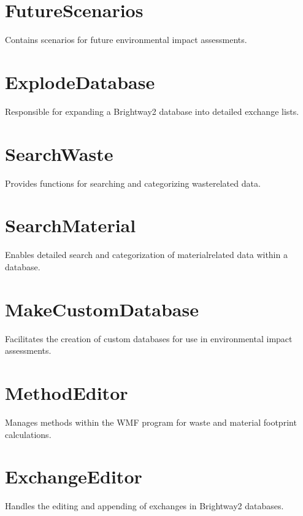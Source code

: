 \documentclass[letterpaper,10pt,english]{sphinxmanual}
\begin{document}
\section{FutureScenarios}
\label{\detokenize{modules:futurescenarios}}
\sphinxAtStartPar
Contains scenarios for future environmental impact assessments.


\section{ExplodeDatabase}
\label{\detokenize{modules:explodedatabase}}
\sphinxAtStartPar
Responsible for expanding a Brightway2 database into detailed exchange lists.


\section{SearchWaste}
\label{\detokenize{modules:searchwaste}}
\sphinxAtStartPar
Provides functions for searching and categorizing waste\sphinxhyphen{}related data.


\section{SearchMaterial}
\label{\detokenize{modules:searchmaterial}}
\sphinxAtStartPar
Enables detailed search and categorization of material\sphinxhyphen{}related data within a database.


\section{MakeCustomDatabase}
\label{\detokenize{modules:makecustomdatabase}}
\sphinxAtStartPar
Facilitates the creation of custom databases for use in environmental impact assessments.


\section{MethodEditor}
\label{\detokenize{modules:methodeditor}}
\sphinxAtStartPar
Manages methods within the WMF program for waste and material footprint calculations.


\section{ExchangeEditor}
\label{\detokenize{modules:exchangeeditor}}
\sphinxAtStartPar
Handles the editing and appending of exchanges in Brightway2 databases.
\end{document}
